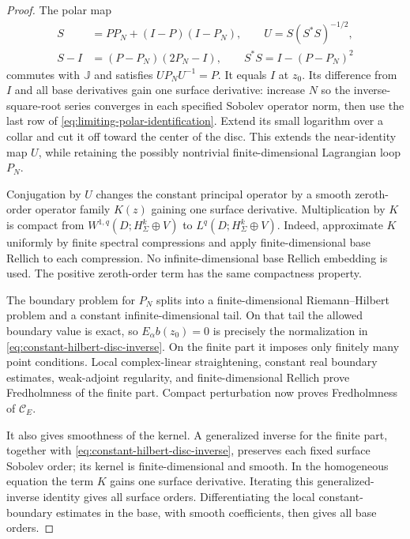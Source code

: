 \documentclass[11pt]{amsart}
\theoremstyle{definition}
\theoremstyle{remark}
\theoremstyle{plain}
\begin{document}
\begin{proof}
The polar map
\begin{equation}\label{eq:limiting-polar-identification}
 \begin{split}
 S&=PP_N+(I-P)(I-P_N),\qquad U=S(S^*S)^{-1/2},\\
 S-I&=(P-P_N)(2P_N-I),\qquad
 S^*S=I-(P-P_N)^2
 \end{split}
\end{equation}
commutes with $\mathbb J$ and satisfies $UP_NU^{-1}=P$.
It equals $I$ at $z_0$. Its difference from $I$ and all base
derivatives gain one surface derivative: increase $N$ so the
inverse-square-root series converges in each specified Sobolev
operator norm, then use the last row of
\eqref{eq:limiting-polar-identification}. Extend its small logarithm
over a collar and cut it off toward the center of the disc.
This extends the near-identity map $U$, while retaining the
possibly nontrivial finite-dimensional Lagrangian loop $P_N$.

Conjugation by $U$ changes the constant principal operator by a
smooth zeroth-order operator family $K(z)$ gaining one surface
derivative. Multiplication by $K$ is compact from
$W^{1,q}(D;H^k_\Sigma\oplus V)$ to
$L^q(D;H^k_\Sigma\oplus V)$. Indeed, approximate $K$ uniformly
by finite spectral compressions and apply finite-dimensional base
Rellich to each compression. No infinite-dimensional base Rellich
embedding is used. The positive zeroth-order term has the same
compactness property.

The boundary problem for $P_N$ splits into a finite-dimensional
Riemann--Hilbert problem and a constant infinite-dimensional tail.
On that tail the allowed boundary value is exact, so
$E_\alpha b(z_0)=0$ is precisely the normalization in
\eqref{eq:constant-hilbert-disc-inverse}. On the finite part it
imposes only finitely many point conditions. Local complex-linear
straightening, constant real boundary estimates, weak-adjoint
regularity, and finite-dimensional Rellich prove Fredholmness of
the finite part. Compact perturbation now proves Fredholmness
of $\mathcal C_E$.

It also gives smoothness of the kernel. A generalized inverse
for the finite part, together with
\eqref{eq:constant-hilbert-disc-inverse}, preserves each fixed
surface Sobolev order; its kernel is finite-dimensional and smooth.
In the homogeneous equation the term $K$ gains one surface
derivative. Iterating this generalized-inverse identity gives all
surface orders. Differentiating the local constant-boundary estimates
in the base, with smooth coefficients, then gives all base orders.


\end{proof}
\end{document}
